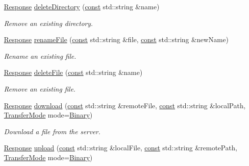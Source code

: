 \begin{DoxyCompactItemize}
\hyperlink{classsf_1_1_ftp_1_1_response}{Response} \hyperlink{classsf_1_1_ftp_a2a8a7ef9144204b5b319c9a4be8806c2}{delete\-Directory} (\hyperlink{term__entry_8h_a57bd63ce7f9a353488880e3de6692d5a}{const} std\-::string \&name)
\begin{DoxyCompactList}\small\item\em Remove an existing directory. \end{DoxyCompactList}\item 
\hyperlink{classsf_1_1_ftp_1_1_response}{Response} \hyperlink{classsf_1_1_ftp_a8f99251d7153e1dc26723e4006deb764}{rename\-File} (\hyperlink{term__entry_8h_a57bd63ce7f9a353488880e3de6692d5a}{const} std\-::string \&file, \hyperlink{term__entry_8h_a57bd63ce7f9a353488880e3de6692d5a}{const} std\-::string \&new\-Name)
\begin{DoxyCompactList}\small\item\em Rename an existing file. \end{DoxyCompactList}\item 
\hyperlink{classsf_1_1_ftp_1_1_response}{Response} \hyperlink{classsf_1_1_ftp_a8aa272b0eb7769a850006e70fcad370f}{delete\-File} (\hyperlink{term__entry_8h_a57bd63ce7f9a353488880e3de6692d5a}{const} std\-::string \&name)
\begin{DoxyCompactList}\small\item\em Remove an existing file. \end{DoxyCompactList}\item 
\hyperlink{classsf_1_1_ftp_1_1_response}{Response} \hyperlink{classsf_1_1_ftp_a20c1600ec5fd6f5a2ad1429ab8aa5df4}{download} (\hyperlink{term__entry_8h_a57bd63ce7f9a353488880e3de6692d5a}{const} std\-::string \&remote\-File, \hyperlink{term__entry_8h_a57bd63ce7f9a353488880e3de6692d5a}{const} std\-::string \&local\-Path, \hyperlink{classsf_1_1_ftp_a1cd6b89ad23253f6d97e6d4ca4d558cb}{Transfer\-Mode} mode=\hyperlink{classsf_1_1_ftp_a1cd6b89ad23253f6d97e6d4ca4d558cba8d9a3497be63da2bf7ed663b1bfd7449}{Binary})
\begin{DoxyCompactList}\small\item\em Download a file from the server. \end{DoxyCompactList}\item 
\hyperlink{classsf_1_1_ftp_1_1_response}{Response} \hyperlink{classsf_1_1_ftp_a46d6e15cddd719288b5a08b685e11765}{upload} (\hyperlink{term__entry_8h_a57bd63ce7f9a353488880e3de6692d5a}{const} std\-::string \&local\-File, \hyperlink{term__entry_8h_a57bd63ce7f9a353488880e3de6692d5a}{const} std\-::string \&remote\-Path, \hyperlink{classsf_1_1_ftp_a1cd6b89ad23253f6d97e6d4ca4d558cb}{Transfer\-Mode} mode=\hyperlink{classsf_1_1_ftp_a1cd6b89ad23253f6d97e6d4ca4d558cba8d9a3497be63da2bf7ed663b1bfd7449}{Binary})

\end{DoxyCompactItemize}
